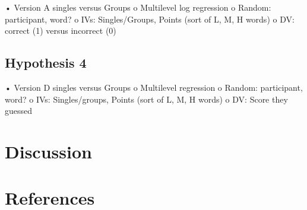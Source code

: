\documentclass[man]{apa6}
\begin{document}
• Version A singles versus Groups
o Multilevel log regression
o Random: participant, word?
o IVs: Singles/Groups, Points (sort of L, M, H words)
o DV: correct (1) versus incorrect (0)

\hypertarget{hypothesis-4}{%
\subsection{Hypothesis 4}\label{hypothesis-4}}

• Version D singles versus Groups
o Multilevel regression
o Random: participant, word?
o IVs: Singles/groups, Points (sort of L, M, H words)
o DV: Score they guessed

\hypertarget{discussion}{%
\section{Discussion}\label{discussion}}

\newpage

\hypertarget{references}{%
\section{References}\label{references}}

\begingroup
\setlength{\parindent}{-0.5in}
\setlength{\leftskip}{0.5in}

\hypertarget{refs}{}

\endgroup
\end{document}
